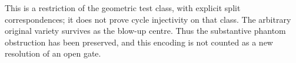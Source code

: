 This is a restriction of the geometric test class, with explicit
split correspondences; it does not prove cycle injectivity on
that class.  The arbitrary original variety survives as the
blow-up centre.  Thus the substantive phantom obstruction has
been preserved, and this encoding is not counted as a new
resolution of an open gate.
